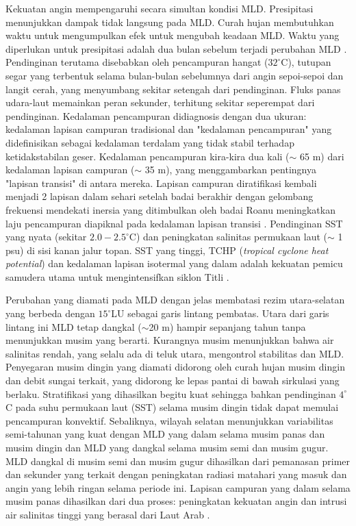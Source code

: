\begin{spacing}{1.5}
	Kekuatan angin mempengaruhi secara simultan kondisi MLD. Presipitasi menunjukkan dampak tidak langsung pada MLD. Curah hujan membutuhkan waktu untuk mengumpulkan efek untuk mengubah keadaan MLD. Waktu yang diperlukan untuk presipitasi adalah dua bulan sebelum terjadi perubahan MLD . Pendinginan terutama disebabkan oleh pencampuran hangat ($32^\circ$C), tutupan segar yang terbentuk selama bulan-bulan sebelumnya dari angin sepoi-sepoi dan langit cerah, yang menyumbang sekitar setengah dari pendinginan. Fluks panas udara-laut memainkan peran sekunder, terhitung sekitar seperempat dari pendinginan. Kedalaman pencampuran didiagnosis dengan dua ukuran: kedalaman lapisan campuran tradisional dan "kedalaman pencampuran" yang didefinisikan sebagai kedalaman terdalam yang tidak stabil terhadap ketidakstabilan geser. Kedalaman pencampuran kira-kira dua kali ($\sim$ 65 m) dari kedalaman lapisan campuran ($\sim$ 35 m), yang menggambarkan pentingnya "lapisan transisi" di antara mereka. Lapisan campuran diratifikasi kembali menjadi 2 lapisan dalam sehari setelah badai berakhir dengan gelombang frekuensi mendekati inersia yang ditimbulkan oleh badai Roanu meningkatkan laju pencampuran diapiknal pada kedalaman lapisan transisi . Pendinginan SST yang nyata (sekitar $2.0 - 2.5^\circ$C) dan peningkatan salinitas permukaan laut ($\sim$ 1 psu) di sisi kanan jalur topan. SST yang tinggi, TCHP (\textit{tropical cyclone heat potential}) dan kedalaman lapisan isotermal yang dalam adalah kekuatan pemicu samudera utama untuk mengintensifkan siklon Titli .
	
	Perubahan yang diamati pada MLD dengan jelas membatasi rezim utara-selatan yang berbeda dengan $15^\circ$LU sebagai garis lintang pembatas. Utara dari garis lintang ini MLD tetap dangkal ($\sim$20 m) hampir sepanjang tahun tanpa menunjukkan musim yang berarti. Kurangnya musim menunjukkan bahwa air salinitas rendah, yang selalu ada di teluk utara, mengontrol stabilitas dan MLD. Penyegaran musim dingin yang diamati didorong oleh curah hujan musim dingin dan debit sungai terkait, yang didorong ke lepas pantai di bawah sirkulasi yang berlaku. Stratifikasi yang dihasilkan begitu kuat sehingga bahkan pendinginan $4^\circ$C pada suhu permukaan laut (SST) selama musim dingin tidak dapat memulai pencampuran konvektif. Sebaliknya, wilayah selatan menunjukkan variabilitas semi-tahunan yang kuat dengan MLD yang dalam selama musim panas dan musim dingin dan MLD yang dangkal selama musim semi dan musim gugur. MLD dangkal di musim semi dan musim gugur dihasilkan dari pemanasan primer dan sekunder yang terkait dengan peningkatan radiasi matahari yang masuk dan angin yang lebih ringan selama periode ini. Lapisan campuran yang dalam selama musim panas dihasilkan dari dua proses: peningkatan kekuatan angin dan intrusi air salinitas tinggi yang berasal dari Laut Arab .
	

\end{spacing}
